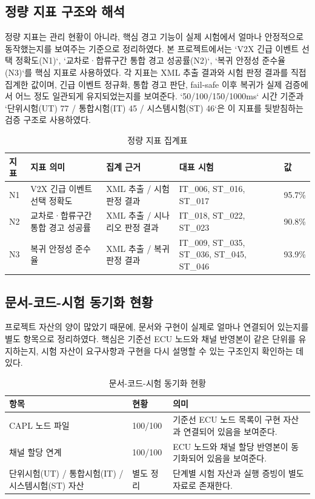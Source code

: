 \documentclass[11pt,a4paper]{article}
\begin{document}
\subsection{정량 지표 구조와 해석}
정량 지표는 관리 현황이 아니라, 핵심 경고 기능이 실제 시험에서 얼마나 안정적으로 동작했는지를 보여주는 기준으로 정리하였다. 본 프로젝트에서는 `V2X 긴급 이벤트 선택 정확도(N1)`, `교차로·합류구간 통합 경고 성공률(N2)`, `복귀 안정성 준수율(N3)`를 핵심 지표로 사용하였다. 각 지표는 XML 추출 결과와 시험 판정 결과를 직접 집계한 값이며, 긴급 이벤트 정규화, 통합 경고 판단, fail-safe 이후 복귀가 실제 검증에서 어느 정도 일관되게 유지되었는지를 보여준다. `50/100/150/1000ms` 시간 기준과 `단위시험(UT) 77 / 통합시험(IT) 45 / 시스템시험(ST) 46`은 이 지표를 뒷받침하는 검증 구조로 사용하였다.

\begin{table}[H]
\centering
\begin{tabularx}{\textwidth}{|p{18mm}|p{34mm}|p{34mm}|p{30mm}|p{18mm}|}
\hline
\textbf{지표} & \textbf{지표 의미} & \textbf{집계 근거} & \textbf{대표 시험} & \textbf{값} \\ \hline
N1 & V2X 긴급 이벤트 선택 정확도 & XML 추출 / 시험 판정 결과 & IT\_006, ST\_016, ST\_017 & 95.7\% \\ \hline
N2 & 교차로·합류구간 통합 경고 성공률 & XML 추출 / 시나리오 판정 결과 & IT\_018, ST\_022, ST\_023 & 90.8\% \\ \hline
N3 & 복귀 안정성 준수율 & XML 추출 / 복귀 판정 결과 & IT\_009, ST\_035, ST\_036, ST\_045, ST\_046 & 93.9\% \\ \hline
\end{tabularx}
\caption{정량 지표 집계표}
\end{table}

\subsection{문서-코드-시험 동기화 현황}
프로젝트 자산의 양이 많았기 때문에, 문서와 구현이 실제로 얼마나 연결되어 있는지를 별도 항목으로 정리하였다. 핵심은 기준선 ECU 노드와 채널 반영본이 같은 단위를 유지하는지, 시험 자산이 요구사항과 구현을 다시 설명할 수 있는 구조인지 확인하는 데 있다.

\begin{table}[H]
\centering
\begin{tabularx}{\textwidth}{|p{50mm}|p{28mm}|X|}
\hline
\textbf{항목} & \textbf{현황} & \textbf{의미} \\ \hline
CAPL 노드 파일 & 100/100 & 기준선 ECU 노드 목록이 구현 자산과 연결되어 있음을 보여준다. \\ \hline
채널 할당 연계 & 100/100 & ECU 노드와 채널 할당 반영본이 동기화되어 있음을 보여준다. \\ \hline
단위시험(UT) / 통합시험(IT) / 시스템시험(ST) 자산 & 별도 정리 & 단계별 시험 자산과 실행 증빙이 별도 자료로 존재한다. \\ \hline
\end{tabularx}
\caption{문서-코드-시험 동기화 현황}
\end{table}
\end{document}
